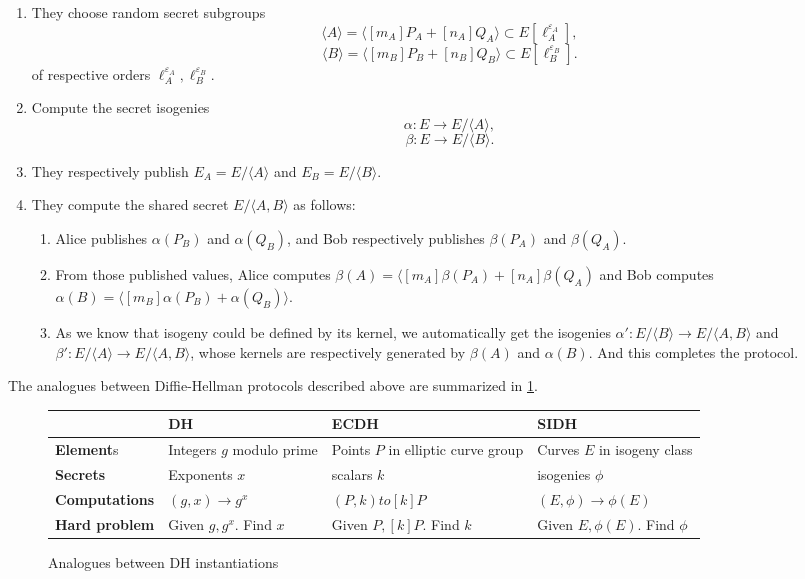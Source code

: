 \documentclass{article}
\theoremstyle{theorem}
\theoremstyle{definition}
\begin{document}
\begin{enumerate}
	\item They choose random secret subgroups
		\[ \langle A \rangle = \langle [m_A]P_A + [n_A]Q_A \rangle \subset E[\ell_A^{\varepsilon_A}], \]
		\[ \langle B \rangle = \langle [m_B]P_B +[n_B]Q_B \rangle \subset E[\ell_B^{\varepsilon_B}]. \]
		of respective orders $\ell_A^{\varepsilon_A}, \ell_B^{\varepsilon_B}$.
		
	\item Compute the secret isogenies
		\[ \alpha: E \to E/\langle A \rangle, \]
		\[ \beta: E \to E/\langle B \rangle. \]
		
	\item They respectively publish $E_A = E/\langle A \rangle$ and $E_B = E/\langle B \rangle$.
	
	\item They compute the shared secret $E / \langle A, B \rangle$ as follows:
		
		\begin{enumerate}
			\item Alice publishes $\alpha(P_B)$ and $\alpha(Q_B)$, and Bob respectively publishes $\beta(P_A)$ and $\beta(Q_A)$. 
			
			\item From those published values, Alice computes $\beta(A) = \langle [m_A]\beta(P_A) + [n_A]\beta(Q_A)$ and Bob computes $\alpha(B) = \langle [m_B]\alpha(P_B) + \alpha(Q_B) \rangle$.
			
			\item As we know that isogeny could be defined by its kernel, we automatically get the isogenies $\alpha': E/\langle B \rangle \to E/\langle A, B \rangle$ and $\beta': E/\langle A \rangle \to E/\langle A, B \rangle$, whose kernels are respectively generated by $\beta(A)$ and $\alpha(B)$. And this completes the protocol.
		\end{enumerate}
\end{enumerate}

The analogues between Diffie-Hellman protocols described above are summarized in \cref{DH-Analogues-table:figure}.

\begin{figure}[h]
	\begin{center}
		\begin{tabular}{| m{2.3cm} | m{2.5cm} m{2.5cm} m{2.5cm} |}
			\hline
			~ & DH & ECDH & SIDH\\
			\hline
			\textbf{Element}s & Integers $g$ modulo prime & Points $P$ in elliptic curve group & Curves $E$ in isogeny class\\
			\hline
			\textbf{Secrets} & Exponents $x$ & scalars $k$ & isogenies $\phi$ \\
			\hline
			\textbf{Computations} & $(g, x) \to g^x$ & $(P, k) to [k]P$ & $(E, \phi) \to \phi(E)$\\
			\hline
			\textbf{Hard problem} & Given $g, g^x$. Find $x$ & Given $P,[k]P$. Find $k$ & Given $E, \phi(E)$. Find $\phi$\\
			\hline 
		\end{tabular}
	\end{center}
\caption{Analogues between DH instantiations}\label{DH-Analogues-table:figure}
\end{figure}
\end{document}

